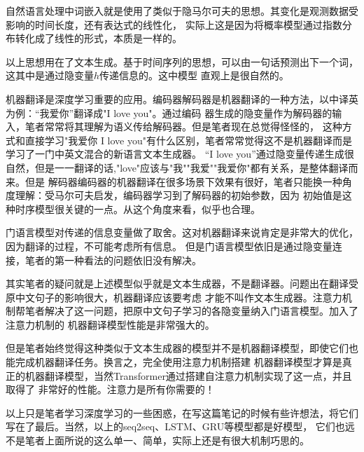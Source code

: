 \documentclass{article}
\begin{document}
        自然语言处理中词嵌入就是使用了类似于隐马尔可夫的思想。其变化是观测数据受影响的时间长度，还有表达式的线性化，
        实际上这是因为将概率模型通过指数分布转化成了线性的形式，本质是一样的。

        以上思想用在了文本生成。基于时间序列的思想，可以由一句话预测出下一个词，这其中是通过隐变量$h$传递信息的。这中模型
        直观上是很自然的。

        机器翻译是深度学习重要的应用。编码器解码器是机器翻译的一种方法，以中译英为例：“我爱你”翻译成"I love you"。通过编码
        器生成的隐变量作为解码器的输入，笔者常常将其理解为语义传给解码器。但是笔者现在总觉得怪怪的，
        这种方式和直接学习"我爱你 I love you"有什么区别，笔者常常觉得这不是机器翻译而是学习了一门中英文混合的新语言文本生成器。
        “I love you”通过隐变量传递生成很自然，但是一一翻译的话,"love"应该与"我""我爱""我爱你"都有关系，是整体翻译而来。但是
        解码器编码器的机器翻译在很多场景下效果有很好，笔者只能换一种角度理解：受马尔可夫启发，编码器学习到了解码器的初始参数，因为
        初始值是这种时序模型很关键的一点。从这个角度来看，似乎也合理。

        门语言模型对传递的信息变量做了取舍。这对机器翻译来说肯定是非常大的优化，因为翻译的过程，不可能考虑所有信息。
        但是门语言模型依旧是通过隐变量连接，笔者的第一种看法的问题依旧没有解决。

        其实笔者的疑问就是上述模型似乎就是文本生成器，不是翻译器。问题出在翻译受原中文句子的影响很大，机器翻译应该要考虑
        才能不叫作文本生成器。注意力机制帮笔者解决了这一问题，把原中文句子学习的各隐变量纳入门语言模型。加入了注意力机制的
        机器翻译模型性能是非常强大的。

        但是笔者始终觉得这种类似于文本生成器的模型并不是机器翻译模型，即使它们也能完成机器翻译任务。换言之，完全使用注意力机制搭建
        机器翻译模型才算是真正的机器翻译模型，当然Transformer通过搭建自注意力机制实现了这一点，并且取得了
        非常好的性能。注意力是所有你需要的！

        以上只是笔者学习深度学习的一些困惑，在写这篇笔记的时候有些许想法，将它们写在了最后。当然，以上的seq2seq、LSTM、GRU等模型都是好模型，
        它们也远不是笔者上面所说的这么单一、简单，实际上还是有很大机制巧思的。
\end{document}
